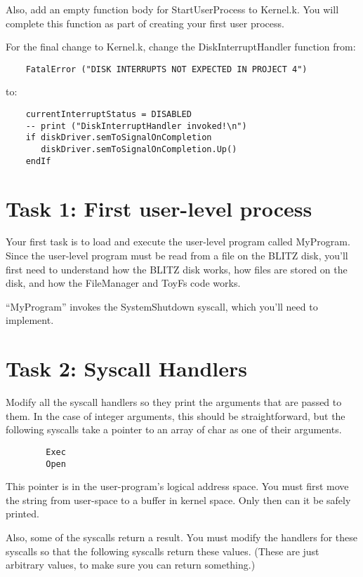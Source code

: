 \documentclass[12pt]{article}
\begin{document}
Also, add an empty function body for StartUserProcess to Kernel.k.  You will 
complete this function as part of creating your first user process.

For the final change to Kernel.k, change the DiskInterruptHandler function from:
\begin{verbatim}
    FatalError ("DISK INTERRUPTS NOT EXPECTED IN PROJECT 4")
\end{verbatim}
to:
\begin{verbatim}
    currentInterruptStatus = DISABLED
    -- print ("DiskInterruptHandler invoked!\n")
    if diskDriver.semToSignalOnCompletion
       diskDriver.semToSignalOnCompletion.Up()
    endIf
\end{verbatim}

\section{Task 1:  First user-level process}

Your first task is to load and execute the user-level program called
MyProgram.  Since the user-level program must be read from a file on
the BLITZ disk, you'll first need to understand how the BLITZ disk
works, how files are stored on the disk, and how the FileManager and
ToyFs code works.

``MyProgram'' invokes the SystemShutdown syscall, which you'll need to
implement.

\section{Task 2: Syscall Handlers}

Modify all the syscall handlers so they print the arguments that are
passed to them.  In the case of integer arguments, this should be
straightforward, but the following syscalls take a pointer to an array
of char as one of their arguments.

\begin{verbatim}
        Exec
        Open
\end{verbatim}

This pointer is in the user-program's logical address space.  You must
first move the string from user-space to a buffer in kernel space.
Only then can it be safely printed.

Also, some of the syscalls return a result.  You must modify the
handlers for these syscalls so that the following syscalls return
these values.  (These are just arbitrary values, to make sure you can
return something.)
\end{document}
